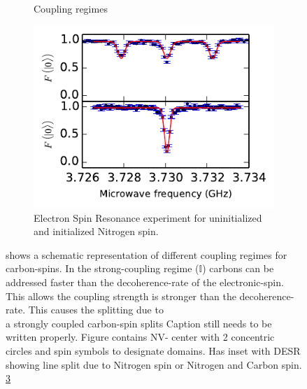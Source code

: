 \begin{figure}[htbp]

    \begin{subfigure}[t]{0.49 \textwidth }\centering
        \centering
        \caption{Coupling regimes }
        \label{fig:coupling regimes}
    \end{subfigure}
    \begin{subfigure}[t]{0.49 \textwidth}\centering
        \includegraphics{Img/DarkESR_2.pdf}
        \caption{Electron Spin Resonance experiment for uninitialized and initialized Nitrogen spin.}
        \label{fig:HF_split_levels}
    \end{subfigure}
    \caption{ shows a schematic representation of different coupling regimes for carbon-spins. In the strong-coupling regime ($\mathbb{I}$) carbons can be addressed faster than the decoherence-rate of the electronic-spin. This allows
    the coupling strength is stronger than the decoherence-rate. This causes the splitting due to
    \\
     a strongly coupled carbon-spin splits
    Caption still needs to be written properly. Figure contains NV- center with 2 concentric circles and spin symbols to designate domains. Has inset with DESR showing line split due to Nitrogen spin or Nitrogen and Carbon spin. \cref{fig:HF_split_levels} }



\end{figure}
